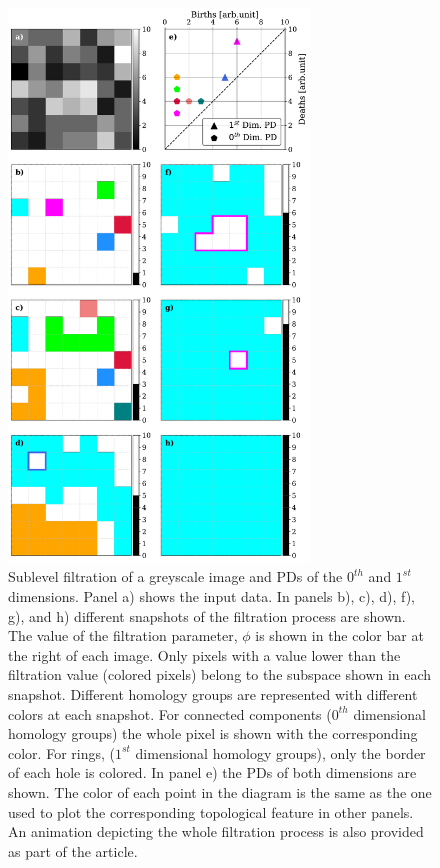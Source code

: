 \documentclass[12pt]{mythesis}
\begin{document}
\begin{figure}
    \centering
     \includegraphics[width=8cm]{figures/PersistentHomology/ImageFiltering_example.pdf}
    \caption{Sublevel filtration of a greyscale image and PDs of the $0^{th}$ and $1^{st}$ dimensions. Panel a) shows the input data. In panels b), c), d), f), g), and h) different snapshots of the filtration process are shown. The value of the filtration parameter, $\phi$ is shown in the color bar at the right of each image. Only pixels with a value lower than the filtration value (colored pixels) belong to the subspace shown in each snapshot. Different homology groups are represented with different colors at each snapshot. For connected components ($0^{th}$ dimensional homology groups) the whole pixel is shown with the corresponding color. For rings, ($1^{st}$ dimensional homology groups), only the border of each hole is colored. In panel e) the PDs of both dimensions are shown. The color of each point in the diagram is the same as the one used to plot the corresponding topological feature in other panels. An animation depicting the whole filtration process is also provided as part of the article.}
   \label{fig_ph: Image Filtration Example}
\end{figure}
\end{document}

